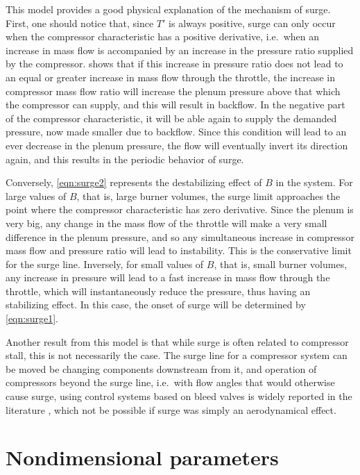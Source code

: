 This model provides a good physical explanation of the mechanism of surge. 
First, one should notice that, since $T'$ is always positive, surge can only occur when the compressor characteristic has a positive derivative, 
i.e.\ when an increase in mass flow is accompanied by an increase in the pressure ratio supplied by the compressor. 
 shows that if this increase in pressure ratio does not lead to an equal or greater increase in mass flow through the throttle, the increase in compressor mass flow ratio will increase the plenum pressure above that which the compressor can supply, and this will result in backflow. In the negative part of the compressor characteristic, it will be able again to supply the demanded pressure, now made smaller due to backflow. Since this condition will lead to an ever decrease in the plenum pressure, the flow will eventually invert its direction again, and this results in the periodic behavior of surge.

Conversely, \cref{eqn:surge2} represents the destabilizing effect of $B$ in the system.
For large values of $B$, that is, large burner volumes, the surge limit approaches the point where the compressor characteristic has zero derivative. Since the plenum is very big, any change in the mass flow of the throttle will make a very small difference in the plenum pressure, and so any simultaneous increase in compressor mass flow and pressure ratio will lead to instability. This is the conservative limit for the surge line.
Inversely, for small values of $B$, that is, small burner volumes, any increase in pressure will lead to a fast increase in mass flow through the throttle, which will instantaneously reduce the pressure, thus having an stabilizing effect. 
In this case, the onset of surge will be determined by \cref{eqn:surge1}.

Another result from this model is that while surge is often related to compressor stall, this is not necessarily the case.
The surge line for a compressor system can be moved be changing components downstream from it, and operation of compressors beyond the surge line, i.e.\ with flow angles that would otherwise cause surge, using control systems based on bleed valves is widely reported in the literature \cite[e.g.][]{Liaw2004}, which not be possible if surge was simply an aerodynamical effect.

\section{Nondimensional parameters}
\label{sec:nondimensional}

